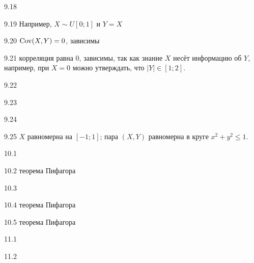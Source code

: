 \protect \hypertarget {soln:9.18}{}
\begin{solution}{{9.18}}
\end{solution}
\protect \hypertarget {soln:9.19}{}
\begin{solution}{{9.19}}
  Например, $X\sim U[0;1]$ и $Y=X$
\end{solution}
\protect \hypertarget {soln:9.20}{}
\begin{solution}{{9.20}}
    $\operatorname{Cov}(X,Y)=0$, зависимы
\end{solution}
\protect \hypertarget {soln:9.21}{}
\begin{solution}{{9.21}}
  корреляция равна $0$, зависимы, так как знание $X$ несёт информацию об $Y$, например, при $X=0$ можно утверждать, что $|Y| \in [1;2]$.
\end{solution}
\protect \hypertarget {soln:9.22}{}
\begin{solution}{{9.22}}
\end{solution}
\protect \hypertarget {soln:9.23}{}
\begin{solution}{{9.23}}
\end{solution}
\protect \hypertarget {soln:9.24}{}
\begin{solution}{{9.24}}
\end{solution}
\protect \hypertarget {soln:9.25}{}
\begin{solution}{{9.25}}
$X$ равномерна на $[-1;1]$; пара $(X, Y)$ равномерна в круге $x^2+y^2 \leq 1$.
\end{solution}
\protect \hypertarget {soln:10.1}{}
\begin{solution}{{10.1}}
\end{solution}
\protect \hypertarget {soln:10.2}{}
\begin{solution}{{10.2}}
теорема Пифагора
\end{solution}
\protect \hypertarget {soln:10.3}{}
\begin{solution}{{10.3}}
\end{solution}
\protect \hypertarget {soln:10.4}{}
\begin{solution}{{10.4}}
теорема Пифагора
\end{solution}
\protect \hypertarget {soln:10.5}{}
\begin{solution}{{10.5}}
теорема Пифагора
\end{solution}
\protect \hypertarget {soln:11.1}{}
\begin{solution}{{11.1}}
\end{solution}
\protect \hypertarget {soln:11.2}{}
\begin{solution}{{11.2}}
\end{solution}
